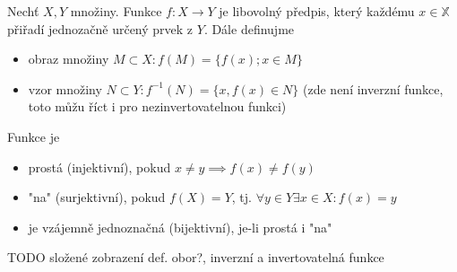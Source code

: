 \begin{definice}
  Nechť $X, Y$ množiny. Funkce $f: X \rightarrow Y$ je libovolný předpis, který každému $x \in \mathbb X$ přiřadí jednozačně určený prvek z $Y$. Dále definujme
  \begin{itemize}
    \item obraz množiny $M \subset X: f(M) = \{f(x); x \in M\}$
    \item vzor množiny $N \subset Y: f^{-1}(N) = \{x, f(x) \in N\}$ (zde  není inverzní funkce, toto můžu říct i pro nezinvertovatelnou funkci)
  \end{itemize}
  Funkce je
  \begin{itemize}
    \item prostá (injektivní), pokud $x \neq y \implies f(x) \neq f(y)$
    \item "na" (surjektivní), pokud $f(X)=Y$, tj. $\forall y \in Y \exists x \in X: f(x)=y$
    \item je vzájemně jednoznačná (bijektivní), je-li prostá i "na"
  \end{itemize}
\end{definice}

TODO složené zobrazení def. obor?, inverzní a invertovatelná funkce

